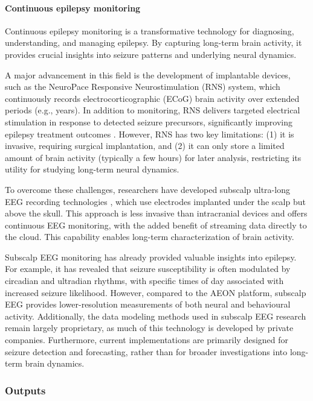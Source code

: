 \documentclass[12pt]{article}
\begin{document}
\paragraph{Continuous epilepsy monitoring}
%
Continuous epilepsy monitoring is a transformative technology for diagnosing,
understanding, and managing epilepsy. By capturing long-term brain activity, it
provides crucial insights into seizure patterns and underlying neural dynamics.

A major advancement in this field is the development of implantable devices,
such as the NeuroPace Responsive Neurostimulation (RNS) system, which
continuously records electrocorticographic (ECoG) brain activity over extended
periods (e.g., years). In addition to monitoring, RNS delivers targeted
electrical stimulation in response to detected seizure precursors,
significantly improving epilepsy treatment outcomes \citep{rao21}. However, RNS
has two key limitations: (1) it is invasive, requiring surgical implantation,
and (2) it can only store a limited amount of brain activity (typically a few
hours) for later analysis, restricting its utility for studying long-term
neural dynamics.

To overcome these challenges, researchers have developed subscalp ultra-long
EEG recording technologies \citep{duunHenriksenEtAl20}, which use electrodes
implanted under the scalp but above the skull. This approach is less invasive
than intracranial devices and offers continuous EEG monitoring, with the added
benefit of streaming data directly to the cloud. This capability enables
long-term characterization of brain activity.

Subscalp EEG monitoring has already provided valuable insights into epilepsy.
For example, it has revealed that seizure susceptibility is often modulated by
circadian and ultradian rhythms, with specific times of day associated with
increased seizure likelihood. However, compared to the AEON platform, subscalp
EEG provides lower-resolution measurements of both neural and behavioural
activity. Additionally, the data modeling methods used in subscalp EEG research
remain largely proprietary, as much of this technology is developed by private
companies. Furthermore, current implementations are primarily designed for
seizure detection and forecasting, rather than for broader investigations into
long-term brain dynamics.

\subsubsection{Outputs}
\label{sec:outputsOfflineAnalysis}
\end{document}

